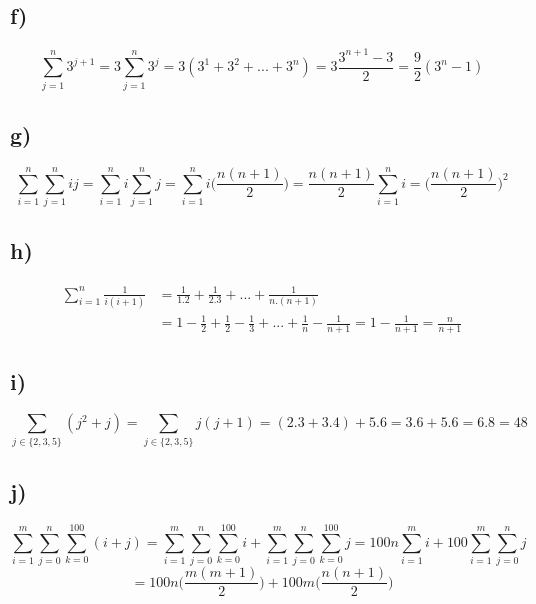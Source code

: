 \documentclass[10pt,a4paper]{article}
\begin{document}
\subsection*{f)} %
    \begin{equation*}
        \sum_{j=1}^{n}3^{j+1} = 3\sum_{j=1}^{n}3^{j}=3(3^1 + 3^2 + ... + 3^n) = 3\frac{3^{n+1}-3}{2}=\frac{9}{2}(3^n-1)
    \end{equation*}
\subsection*{g)} %
    \begin{equation*}
        \sum_{i=1}^{n}{\sum_{j=1}^{n}ij} =  \sum_{i=1}^{n}i{\sum_{j=1}^{n}j}= \sum_{i=1}^{n}{i\bigg({\frac{n(n+1)}{2}}\bigg)}=\frac{n(n+1)}{2}\sum_{i=1}^{n}i=\bigg(\frac{n(n+1)}{2}\bigg)^2
    \end{equation*}
\subsection*{h)} %
    \begin{align*}
        \sum_{i=1}^{n}\frac{1}{i(i+1)}
        & = \frac{1}{1.2}+\frac{1}{2.3}+...+\frac{1}{n.(n+1)}\\ 
        & = 1-\frac{1}{2}+\frac{1}{2}-\frac{1}{3}+...+\frac{1}{n}-\frac{1}{n+1}
          =1-\frac{1}{n+1}=\frac{n}{n+1}
    \end{align*}
\subsection*{i)} %
    \begin{equation*}
        \sum_{j \in \{2,3,5\}}(j^2+j)=\sum_{j \in \{2,3,5\}}j(j+1) 
        = (2.3 + 3.4) + 5.6 = 3.6 + 5.6 = 6.8 = 48 
    \end{equation*}
\subsection*{j)} %
    \begin{equation*}
         \sum_{i=1}^{m}\sum_{j=0}^{n}{{\sum_{k=0}^{100}{(i+j)}}}=\sum_{i=1}^{m}\sum_{j=0}^{n}{{\sum_{k=0}^{100}{i}}}+\sum_{i=1}^{m}\sum_{j=0}^{n}{{\sum_{k=0}^{100}{j}}}=100n\sum_{i=1}^{m}i+100\sum_{i=1}^{m}\sum_{j=0}^{n}j    
    \end{equation*}
    \begin{equation*}
        =100n\bigg(\frac{m(m+1)}{2}\bigg)+100m\bigg(\frac{n(n+1)}{2}\bigg)
    \end{equation*}    
\end{document}
